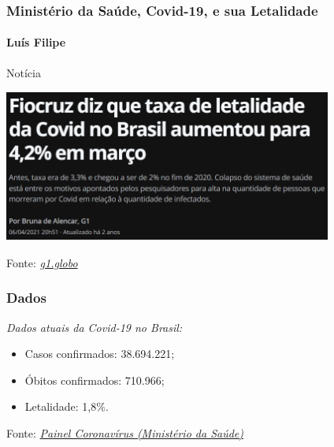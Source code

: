 \documentclass[compress,12pt]{beamer}
\begin{document}
\begin{frame}
    \frametitle{Ministério da Saúde, Covid-19, e sua Letalidade}
    \framesubtitle{Luís Filipe}
    Notícia
    
    \centering
    \includegraphics[width=108mm, height=50mm]{Imagens/noticiaLetalidade(2).png}

    Fonte: \href{https://g1.globo.com/bemestar/coronavirus/noticia/2021/04/06/fiocruz-diz-que-taxa-de-letalidade-por-covid-19-no-brasil-aumentou-em-marco-para-42percent.ghtml}{\textit{g1.globo}}
\end{frame}

\begin{frame}
    \frametitle{Dados}
    \textit{Dados atuais da Covid-19 no Brasil:}
    \begin{itemize}
        \item Casos confirmados: 38.694.221;
        \item Óbitos confirmados: 710.966;
        \item Letalidade: 1,8\%.
    \end{itemize}
    \centering
    Fonte: \href{https://covid.saude.gov.br}{\textit{Painel Coronavírus (Ministério da Saúde)}}
\end{frame}
\end{document}
